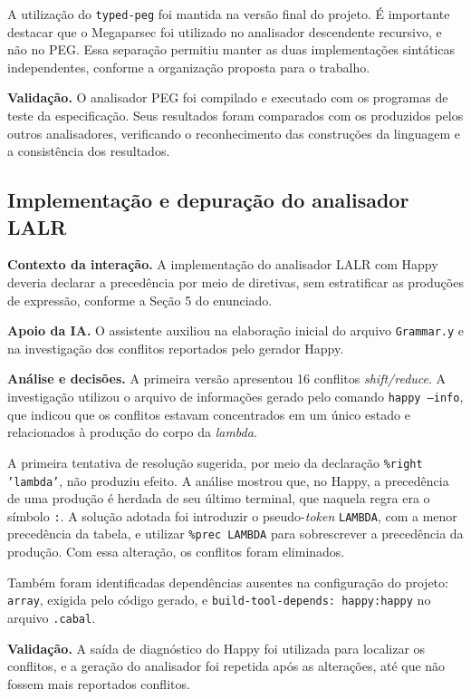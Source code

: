 A utilização do \texttt{typed-peg} foi mantida na versão final
do projeto. É importante destacar que o Megaparsec foi utilizado
no analisador descendente recursivo, e não no PEG. Essa separação
permitiu manter as duas implementações sintáticas independentes,
conforme a organização proposta para o trabalho.

\textbf{Validação.} O analisador PEG foi compilado e executado
com os programas de teste da especificação. Seus resultados
foram comparados com os produzidos pelos outros analisadores,
verificando o reconhecimento das construções da linguagem e
a consistência dos resultados.

\subsection{Implementação e depuração do analisador LALR}

\textbf{Contexto da interação.} A implementação do analisador
LALR com Happy deveria declarar a precedência por meio de
diretivas, sem estratificar as produções de expressão,
conforme a Seção 5 do enunciado.

\textbf{Apoio da IA.} O assistente auxiliou na elaboração
inicial do arquivo \texttt{Grammar.y} e na investigação
dos conflitos reportados pelo gerador Happy.

\textbf{Análise e decisões.} A primeira versão apresentou
16 conflitos \emph{shift/reduce}. A investigação utilizou
o arquivo de informações gerado pelo comando
\texttt{happy --info}, que indicou que os conflitos estavam
concentrados em um único estado e relacionados à produção
do corpo da \emph{lambda}.

A primeira tentativa de resolução sugerida, por meio da
declaração \texttt{\%right 'lambda'}, não produziu efeito.
A análise mostrou que, no Happy, a precedência de uma
produção é herdada de seu último terminal, que naquela
regra era o símbolo \texttt{:}. A solução adotada foi
introduzir o pseudo-\emph{token} \texttt{LAMBDA}, com a
menor precedência da tabela, e utilizar
\texttt{\%prec LAMBDA} para sobrescrever a precedência
da produção. Com essa alteração, os conflitos foram
eliminados.

Também foram identificadas dependências ausentes na
configuração do projeto: \texttt{array}, exigida pelo
código gerado, e \texttt{build-tool-depends: happy:happy}
no arquivo \texttt{.cabal}.

\textbf{Validação.} A saída de diagnóstico do Happy foi
utilizada para localizar os conflitos, e a geração do
analisador foi repetida após as alterações, até que
não fossem mais reportados conflitos.

